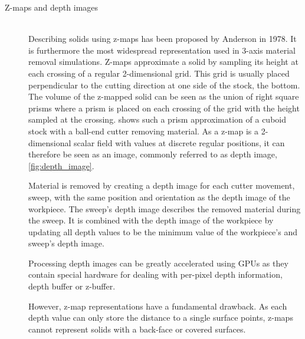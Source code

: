 \begin{description}
	\item[Z-maps and depth images] \hfill \\
	Describing solids using z-maps has been proposed by Anderson \cite{zmap} in 1978.
	It is furthermore the most widespread representation used in 3-axis material removal simulations.
	Z-maps approximate a solid by sampling its height at each crossing of a regular 2-dimensional grid.
	This grid is usually placed perpendicular to the cutting direction at one side of the stock, \eg the bottom.
	The volume of the z-mapped solid can be seen as the union of right square prisms where a prism is placed on each crossing of the grid with the height sampled at the crossing.
	 shows such a prism approximation of a cuboid stock with a ball-end cutter removing material.
	As a z-map is a 2-dimensional scalar field with values at discrete regular positions, it can therefore be seen as an image, commonly referred to as depth image, \cf \cref{fig:depth_image}.

	Material is removed by creating a depth image for each cutter movement, \aka sweep, with the same position and orientation as the depth image of the workpiece.
	The sweep's depth image describes the removed material during the sweep.
	It is combined with the depth image of the workpiece by updating all depth values to be the minimum value of the workpiece's and sweep's depth image.

	Processing depth images can be greatly accelerated using GPUs as they contain special hardware for dealing with per-pixel depth information, \ie depth buffer or z-buffer.

	However, z-map representations have a fundamental drawback.
	As each depth value can only store the distance to a single surface points, z-maps cannot represent solids with a back-face or covered surfaces.


\end{description}
